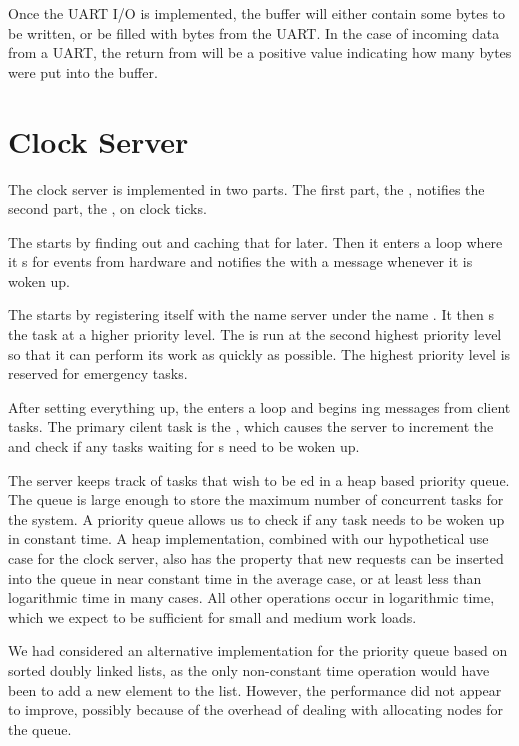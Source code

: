 \documentclass[pdftex,10pt,a4paper]{article}
\begin{document}
Once the UART I/O is implemented, the  buffer will either
contain some bytes to be written, or be filled with bytes from the
UART. In the case of incoming data from a UART, the return from
 will be a positive value indicating how many bytes
were put into the  buffer.

\section*{Clock Server}

The clock server is implemented in two parts. The first part, the
, notifies the second part, the
, on clock ticks.

The  starts by finding out 
and caching that  for later. Then it enters a 
loop where it s for  events from hardware
and notifies the  with a  message whenever it
is woken up.

The  starts by registering itself with the name
server under the name . It then s the
 task at a higher priority level. The
 is run at the second highest priority level so
that it can perform its work as quickly as possible. The highest
priority level is reserved for emergency tasks.

After setting everything up, the  enters a
 loop and begins ing messages from client
tasks. The primary cilent task is the , which
causes the server to increment the  and check if any tasks
waiting for s need to be woken up.

The server keeps track of tasks that wish to be ed in a
heap based priority queue. The queue is large enough to store the
maximum number of concurrent tasks for the system. A priority queue
allows us to check if any task needs to be woken up in constant
time. A heap implementation, combined with our hypothetical use case
for the clock server, also has the property that new 
requests can be inserted into the queue in near constant time in the
average case, or at least less than logarithmic time in many
cases. All other operations occur in logarithmic time, which we expect
to be sufficient for small and medium work loads.

We had considered an alternative implementation for the priority queue
based on sorted doubly linked lists, as the only non-constant time
operation would have been to add a new element to the list. However,
the performance did not appear to improve, possibly because of the
overhead of dealing with allocating nodes for the queue.
\end{document}
